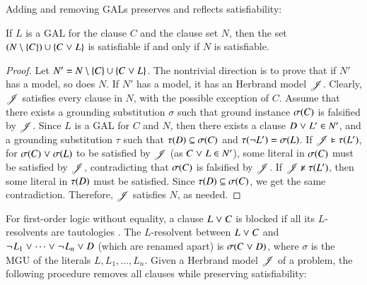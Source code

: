 Adding and removing GALs preserves and reflects satisfiability:

\begin{theorem}
   \label{thm:gal}
   If $L$ is a GAL for the clause $C$ and the clause set $N$, then the set $(N \setminus
   \{C\}) \cup\allowbreak \{ C \mathrel{\lor}\nobreak L \}$ is satisfiable if and only if $N$ is satisfiable.
\end{theorem}
\begin{rep}%
\begin{proof}
   Let $N' = N \setminus \{C\} \cup \{ C \mathrel{\lor} L \}$.
   The nontrivial direction is to prove that if $N'$ has a model, so does
   $N.$ If $N'$ has a model, it has an Herbrand model $\mathscr{J}$. Clearly,
   $\mathscr{J}$ satisfies every clause in $N$, with the possible exception of
   $C$. Assume that there exists a grounding substitution $\sigma$ such that ground instance $\sigma(C)$ is falsified by
   $\mathscr{J}$. Since $L$ is a GAL for $C$ and $N$, then there exists a clause $D \mathrel{\lor} L' \in N'$, and a grounding substitution $\tau$ such that
   $\tau(D) \subseteq \sigma(C)$ and $\tau(\neg L') =
   \sigma(L)$. If $\mathscr{J} \vDash
   \tau(L')$, for $\sigma(C) \mathrel{\lor} \sigma(L)$ to be satisfied by $\mathscr{J}$ (as $C \mathrel{\lor} L \in N'$), some
   literal in $\sigma(C)$ must be satisfied by $\mathscr{J}$, contradicting that
   $\sigma(C)$ is falsified by $\mathscr{J}$. If $\mathscr{J} \nvDash \tau(L')$,
   then some literal in $\tau(D)$ must be satisfied. Since $\tau(D) \subseteq \sigma(C)$,
   we get the same contradiction. Therefore, $\mathscr{J}$ satisfies $N$,
   as needed.
 \end{proof}

\end{rep}
For first-order logic without equality, a clause $L \mathrel{\lor} C$ is blocked if all its
$L$-resolvents are tautologies \cite{ksstb-2017-blockedfol}. The $L$-resolvent
between $L \mathrel{\lor} C$ and $\neg{\kern.2ex L_1} \mathrel{\lor} \cdots \mathrel{\lor} \neg{\kern.2ex L_n} \mathrel{\lor}
D$ (which are renamed apart) is $\sigma(C \mathrel{\lor} D)$, where $\sigma$ is the MGU
of the literals $L, L_1, \ldots, L_n$.
Given a Herbrand model $\mathscr{J}$ of a problem, the following procedure
removes all clauses while preserving satisfiability:

